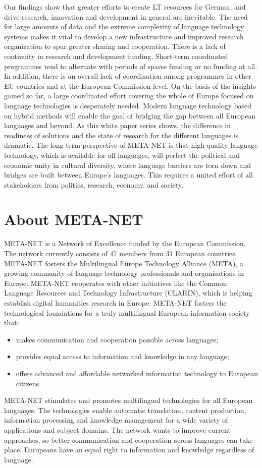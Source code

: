 \documentclass[]{../metanetpaper}
\begin{document}
Our findings show that greater efforts to create LT resources for German, and drive research, innovation and development in general are inevitable. The need for large amounts of data and the extreme complexity of language technology systems makes it vital to develop a new infrastructure and improved research organization to spur greater sharing and cooperation.
There is a lack of continuity in research and development funding. Short-term coordinated programmes tend to alternate with periods of sparse funding or no funding at all. In addition, there is an overall lack of coordination among programmes in other EU countries and at the European Commission level.
On the basis of the insights gained so far, a large coordinated effort covering the whole of Europe focused on language technologies is desperately needed.
Modern language technology based on hybrid methods will enable the goal of bridging the gap between all European languages and beyond. As this white paper series shows, the difference in readiness of solutions and the state of research for the different languages is dramatic. 
The long-term perspective of META-NET is that high-quality language technology, which is available for all languages, will perfect the political and economic unity in cultural diversity, where language barriers are torn down and bridges are built between Europe’s languages. This requires a united effort of all stakeholders from politics, research, economy, and society.

	\section{About META-NET}
META-NET is a Network of Excellence funded by the European Commission. The network currently consists of 47 members from 31 European countries. META-NET fosters the Multilingual Europe Technology Alliance (META), a growing community of language technology professionals and organisations in Europe. 
META-NET cooperates with other initiatives like the Common Language Resources and Technology Infrastructure (CLARIN), which is helping establish digital humanities research in Europe. META-NET fosters the technological foundations for a truly multilingual European information society that:
\begin{itemize}
\item makes communication and cooperation possible across languages;
\item provides equal access to information and knowledge in any language;
\item offers advanced and affordable networked information technology to European citizens.
\end{itemize}
META-NET stimulates and promotes multilingual technologies for all European languages. The technologies enable automatic translation, content production, information processing and knowledge management for a wide variety of applications and subject domains. The network wants to improve current approaches, so better communication and cooperation across languages can take place. Europeans have an equal right to information and knowledge regardless of language. 
 
\end{document}
